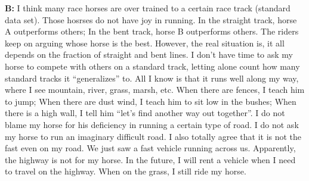 \documentclass{sig-alternate}
\begin{document}
\textbf{B:}
I think many race horses are over trained to a certain race track (standard data set). 
Those hosrses do not have joy in running. 
In the straight track, horse A outperforms others;
In the bent track, horse B outperforms others. 
The riders keep on arguing whose horse is the best. 
However, the real situation is, it all depends on 
the fraction of straight and bent lines. 
I don't have time to ask my horse to compete with others on a standard track, 
letting alone count how many standard tracks it ``generalizes'' to. 
All I know is that it runs well along my way, 
where I see mountain, river, grass, marsh, etc. 
When there are fences, I teach him to jump; 
When there are dust wind, I teach him to sit low in the bushes; 
When there is a high wall, I tell him ``let's find another way out together''. 
I do not blame my horse for his deficiency in running a certain type of road. 
I do not ask my horse to run an imaginary difficult road. 
I also totally agree that it is not the fast even on my road. 
We just saw a fast vehicle running across us. 
Apparently, the highway is not for my horse. 
In the future, I will rent a vehicle when I need to travel on the highway. 
When on the grass, I still ride my horse. 
\end{document}
